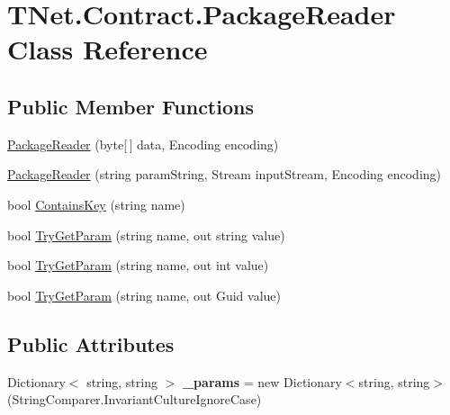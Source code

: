 \hypertarget{class_t_net_1_1_contract_1_1_package_reader}{}\section{T\+Net.\+Contract.\+Package\+Reader Class Reference}
\label{class_t_net_1_1_contract_1_1_package_reader}


 


\subsection*{Public Member Functions}
\begin{DoxyCompactItemize}
\item 
\mbox{\hyperlink{class_t_net_1_1_contract_1_1_package_reader_aa579fe95418e73d3620cce6505620316}{Package\+Reader}} (byte\mbox{[}$\,$\mbox{]} data, Encoding encoding)
\item 
\mbox{\hyperlink{class_t_net_1_1_contract_1_1_package_reader_a8a8051d877e966722ccf57194b29d938}{Package\+Reader}} (string param\+String, Stream input\+Stream, Encoding encoding)
\item 
bool \mbox{\hyperlink{class_t_net_1_1_contract_1_1_package_reader_a0da79ea3158748f966c1b33ce5d8ef69}{Contains\+Key}} (string name)
\item 
bool \mbox{\hyperlink{class_t_net_1_1_contract_1_1_package_reader_a9e545aba8588acff3fa714103129eb99}{Try\+Get\+Param}} (string name, out string value)
\item 
bool \mbox{\hyperlink{class_t_net_1_1_contract_1_1_package_reader_acb4228af36efa0a6ba79b45b780378f2}{Try\+Get\+Param}} (string name, out int value)
\item 
bool \mbox{\hyperlink{class_t_net_1_1_contract_1_1_package_reader_a3fb508437fc11c379e8b7552bd9e98e2}{Try\+Get\+Param}} (string name, out Guid value)
\end{DoxyCompactItemize}
\subsection*{Public Attributes}
\begin{DoxyCompactItemize}
\item 
\mbox{\label{class_t_net_1_1_contract_1_1_package_reader_ac687aa5f4c62056c7fcdcea3d063bf1e}} 
Dictionary$<$ string, string $>$ {\bfseries \+\_\+params} = new Dictionary$<$string, string$>$(String\+Comparer.\+Invariant\+Culture\+Ignore\+Case)
\end{DoxyCompactItemize}
